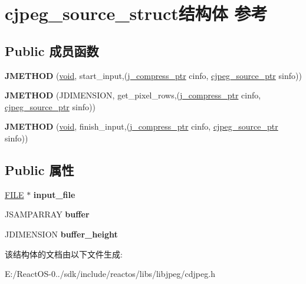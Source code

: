 \hypertarget{structcjpeg__source__struct}{}\section{cjpeg\+\_\+source\+\_\+struct结构体 参考}
\label{structcjpeg__source__struct}
\subsection*{Public 成员函数}
\begin{DoxyCompactItemize}
\item 
\mbox{\label{structcjpeg__source__struct_a0c0027418e48e9cd566807b4c7110aa1}} 
{\bfseries J\+M\+E\+T\+H\+OD} (\hyperlink{interfacevoid}{void}, start\+\_\+input,(\hyperlink{structjpeg__compress__struct}{j\+\_\+compress\+\_\+ptr} cinfo, \hyperlink{structcjpeg__source__struct}{cjpeg\+\_\+source\+\_\+ptr} sinfo))
\item 
\mbox{\label{structcjpeg__source__struct_adac53dc0fdf95208d2458921ebacb93e}} 
{\bfseries J\+M\+E\+T\+H\+OD} (J\+D\+I\+M\+E\+N\+S\+I\+ON, get\+\_\+pixel\+\_\+rows,(\hyperlink{structjpeg__compress__struct}{j\+\_\+compress\+\_\+ptr} cinfo, \hyperlink{structcjpeg__source__struct}{cjpeg\+\_\+source\+\_\+ptr} sinfo))
\item 
\mbox{\label{structcjpeg__source__struct_a58d0834ab3f3ed64eba2251415744b71}} 
{\bfseries J\+M\+E\+T\+H\+OD} (\hyperlink{interfacevoid}{void}, finish\+\_\+input,(\hyperlink{structjpeg__compress__struct}{j\+\_\+compress\+\_\+ptr} cinfo, \hyperlink{structcjpeg__source__struct}{cjpeg\+\_\+source\+\_\+ptr} sinfo))
\end{DoxyCompactItemize}
\subsection*{Public 属性}
\begin{DoxyCompactItemize}
\item 
\mbox{\label{structcjpeg__source__struct_a88d55b02438c0a3ce21422aa8578679e}} 
\hyperlink{struct__iobuf}{F\+I\+LE} $\ast$ {\bfseries input\+\_\+file}
\item 
\mbox{\label{structcjpeg__source__struct_a2ffe2e6e6af7f434f712295d1760e001}} 
J\+S\+A\+M\+P\+A\+R\+R\+AY {\bfseries buffer}
\item 
\mbox{\label{structcjpeg__source__struct_a01c25aca7ac8fed165b05139aeb1f762}} 
J\+D\+I\+M\+E\+N\+S\+I\+ON {\bfseries buffer\+\_\+height}
\end{DoxyCompactItemize}


该结构体的文档由以下文件生成\+:\begin{DoxyCompactItemize}
\item 
E\+:/\+React\+O\+S-\/0../sdk/include/reactos/libs/libjpeg/cdjpeg.\+h\end{DoxyCompactItemize}
